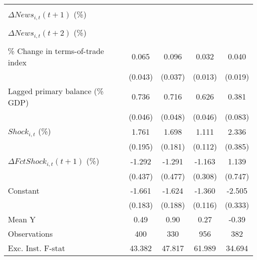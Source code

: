 {\begin{tabular}{l*{4}{c}}
                    &                     &                     &                     &                     \\
\addlinespace
$ \Delta News_{i,t}(t+1)$ (\%)&                     &                     &                     &                     \\
                    &                     &                     &                     &                     \\
\addlinespace
$ \Delta News_{i,t}(t+2)$ (\%)&                     &                     &                     &                     \\
                    &                     &                     &                     &                     \\
\addlinespace
\% Change in terms-of-trade index&       0.065         &       0.096\sym{**} &       0.032\sym{**} &       0.040\sym{**} \\
                    &     (0.043)         &     (0.037)         &     (0.013)         &     (0.019)         \\
\addlinespace
Lagged primary balance (\% GDP)&       0.736\sym{***}&       0.716\sym{***}&       0.626\sym{***}&       0.381\sym{***}\\
                    &     (0.046)         &     (0.048)         &     (0.046)         &     (0.083)         \\
\addlinespace
$ Shock_{i,t}$ (\%) &       1.761\sym{***}&       1.698\sym{***}&       1.111\sym{***}&       2.336\sym{***}\\
                    &     (0.195)         &     (0.181)         &     (0.112)         &     (0.385)         \\
\addlinespace
$ \Delta FctShock_{i,t}(t+1)$ (\%)&      -1.292\sym{***}&      -1.291\sym{**} &      -1.163\sym{***}&       1.139         \\
                    &     (0.437)         &     (0.477)         &     (0.308)         &     (0.747)         \\
\addlinespace
Constant            &      -1.661\sym{***}&      -1.624\sym{***}&      -1.360\sym{***}&      -2.505\sym{***}\\
                    &     (0.183)         &     (0.188)         &     (0.116)         &     (0.333)         \\
\midrule
Mean Y              &        0.49         &        0.90         &        0.27         &       -0.39         \\
Observations        &         400         &         330         &         956         &         382         \\
Exc. Inst. F-stat   &      43.382         &      47.817         &      61.989         &      34.694         \\
\bottomrule
\end{tabular}
}

